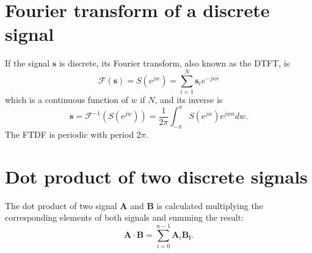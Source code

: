 \begin{subappendices}

\section{Fourier transform of a discrete signal}
\label{sec:FTDF}

If the signal $\mathbf{s}$ is discrete, its Fourier transform, also
known as the \gls{DTFT}, is
\begin{equation}
  \mathcal{F}(\mathbf{s}) = S(e^{jw}) = \sum_{i=1}^{N}\mathbf{s}_ie^{-jwi}
\end{equation}
which is a continuous function of $w$ if $N$, and its inverse is
\begin{equation}
  \mathbf{s} = \mathcal{F}^{-1}(S(e^{jw})) = \frac{1}{2\pi}\int_{-\pi}^{\pi}S(e^{jw})e^{jwn}dw.
\end{equation}
The \acrshort{FTDF} is periodic with period $2\pi$.


\section{Dot product of two discrete signals}
The dot product of two signal $\mathbf{A}$ and $\mathbf{B}$ is
calculated multiplying the corresponding elements of both signals and
summing the result:
\begin{equation}
  \mathbf{A}\cdot\mathbf{B} = \sum_{i=0}^{n-1}\mathbf{A}_i\mathbf{B_i}.
\end{equation}

\end{subappendices}

